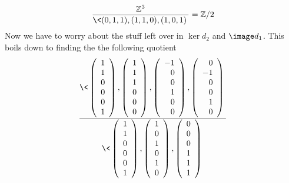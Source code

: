 \[ \frac{\mathbb Z^3}{\< (0,1,1),(1,1,0),(1,0,1) \>} = \mathbb Z/2 \]
Now we have to worry about the stuff left over in $\ker d_2$ and $\image d_1$. This boils down to finding the the following quotient
\[ \frac{ \< \left( \begin{array}{r} 1\\1\\0\\0\\0\\1 \end{array} \right),
             \left( \begin{array}{r} 1\\1\\1\\0\\0\\0 \end{array} \right),
             \left( \begin{array}{r} -1\\0\\0\\1\\0\\0 \end{array} \right),
             \left( \begin{array}{r} 0\\-1\\0\\0\\1\\0 \end{array} \right)
           \>}{ \< 
             \left( \begin{array}{r} 1\\1\\0\\0\\0\\1 \end{array} \right), 
             \left( \begin{array}{r} 1\\0\\1\\0\\1\\0 \end{array} \right), 
             \left( \begin{array}{r} 0\\0\\0\\1\\1\\1 \end{array} \right) 
\> } \]
